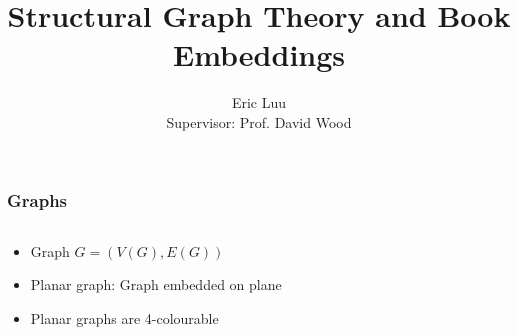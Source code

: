 \documentclass[english]{beamer}
\author{Eric Luu
\\[1 cm]
\footnotesize{Supervisor: Prof. David Wood}
}
\title{Structural Graph Theory and Book Embeddings}
\begin{document}
\frame{\titlepage}

\begin{frame}
  \frametitle{Graphs}

  \begin{columns}
    \begin{column}{0.5\textwidth}
      \begin{itemize}
        \item Graph $G = (V(G), E(G))$
        \item Planar graph: Graph embedded on plane
        \item Planar graphs are 4-colourable \cite{appelEveryPlanarMap1989}
      \end{itemize}
    \end{column}

    \begin{column}{0.5 \textwidth}
      \begin{figure}
        \centering
        
      \end{figure}
    \end{column}
  \end{columns}
\end{frame}
\end{document}
